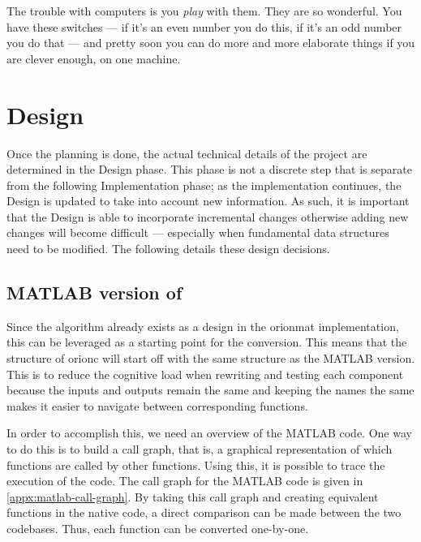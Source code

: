 \begin{savequote}[0.55\linewidth]
	\begin{fancyquote}
		The trouble with computers is you \emph{play} with them. They are so
		wonderful. You have these switches --- if it's an even number you do
		this, if it's an odd number you do that --- and pretty soon you can
		do more and more elaborate things if you are clever enough, on one
		machine.
	\end{fancyquote}
\end{savequote}
\chapter{Design}\label{ch:design}

Once the planning is done, the actual technical details of the
project are determined in the Design phase. This phase is not a
discrete step that is separate from the following Implementation
phase; as the implementation continues, the Design is updated to
take into account new information. As such, it is important that
the Design is able to incorporate incremental changes otherwise
adding new changes will become difficult --- especially
when fundamental data structures need to be modified. The following
details these design decisions.

\section{MATLAB version of }

Since the algorithm already exists as a design in the \gls{orionmat}
implementation, this can be leveraged as a starting point for the
conversion. This means that the structure of \gls{orionc} will
start off with the same structure as the MATLAB version. This is
to reduce the cognitive load when rewriting and testing each
component because the inputs and outputs remain the same and
keeping the names the same makes it easier to navigate between
corresponding functions.

In order to accomplish this, we need an overview of the MATLAB
code. One way to do this is to build a call graph, that is, a
graphical representation of which functions are called by other
functions. Using this, it is possible to trace the execution of
the code. The call graph for the MATLAB code is given in \cref{appx:matlab-call-graph}.
By taking this call graph
and creating equivalent functions in the native code, a direct
comparison can be made between the two codebases. Thus, each
function can be converted one-by-one.

